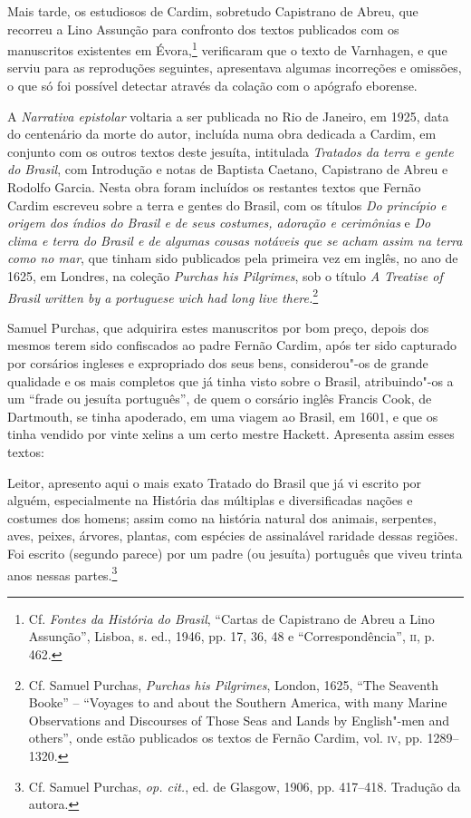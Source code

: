 Mais tarde, os estudiosos de Cardim, sobretudo Capistrano de Abreu,
que recorreu a Lino Assunção para confronto dos textos publicados com
os manuscritos existentes em Évora,\footnote{ Cf. \textit{Fontes
da História do Brasil}, ``Cartas de Capistrano de Abreu a Lino
Assunção'', Lisboa, s. ed., 1946, pp. 17, 36, 48 e
``Correspondência'', \textsc{ii}, p. 462.} verificaram que o texto de
Varnhagen, e que serviu para as reproduções seguintes, apresentava
algumas incorreções e omissões, o que só foi possível detectar através
da colação com o apógrafo eborense. 

A \textit{Narrativa epistolar} voltaria a ser publicada no Rio de
Janeiro, em 1925, data do centenário da morte do autor, incluída numa obra
dedicada a Cardim, em conjunto com os outros textos deste jesuíta,
intitulada \textit{Tratados da terra e gente do Brasil}, com Introdução
e notas de Baptista Caetano, Capistrano de Abreu e Rodolfo Garcia.
Nesta obra foram incluídos os restantes textos que Fernão Cardim
escreveu sobre a terra e gentes do Brasil, com os títulos \textit{Do
princípio e origem dos índios do Brasil e de seus costumes, adoração e
cerimônias} e \textit{Do clima e terra do Brasil e de algumas cousas
notáveis que se acham assim na terra como no mar}, que tinham sido
publicados pela primeira vez em inglês, no ano de 1625, em Londres, na
coleção \textit{Purchas his Pilgrimes}, sob o título \textit{A
Treatise of Brasil written by a portuguese wich had long live there.}\footnote{ Cf. 
Samuel Purchas, \textit{Purchas his Pilgrimes}, 
London, 1625, ``The Seaventh Booke'' -- ``Voyages to and about the
Southern America, with many Marine Observations and Discourses of Those
Seas and Lands by English"-men and others'', onde estão publicados os
textos de Fernão Cardim, vol. \textsc{iv}, pp. 1289--1320.} 

Samuel Purchas, que adquirira estes manuscritos por bom preço, depois
dos mesmos terem sido confiscados ao padre Fernão Cardim, após ter sido
capturado por corsários ingleses e expropriado dos seus bens,
considerou"-os de grande qualidade e os mais completos que já tinha
visto sobre o Brasil, atribuindo"-os a um ``frade ou jesuíta português'',
de quem o corsário inglês Francis Cook, de Dartmouth, se tinha
apoderado, em uma viagem ao Brasil, em 1601, e que os tinha vendido por
vinte xelins a um certo mestre Hackett. Apresenta assim esses textos:

\begin{hedraquote}
Leitor, apresento aqui o mais exato Tratado do Brasil que
já vi escrito por alguém, especialmente na História das múltiplas e
diversificadas nações e costumes dos homens; assim como na história
natural dos animais, serpentes, aves, peixes, árvores, plantas, com
espécies de assinalável raridade dessas regiões. Foi escrito (segundo
parece) por um padre (ou jesuíta) português que viveu trinta anos
nessas partes.\footnote{ Cf. Samuel Purchas, \textit{op. cit.}, 
ed. de Glasgow, 1906, pp. 417--418. Tradução da autora.}
\end{hedraquote}


